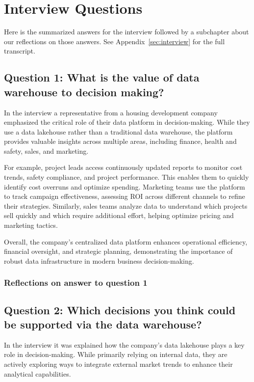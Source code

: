 \section{Interview Questions}
Here is the summarized answers for the interview followed by a subchapter about our reflections on those answers. See Appendix~\ref{sec:interview} for the full transcript.
\subsection{Question 1: What is the value of data warehouse to decision making?}

In the interview a representative from a housing development company emphasized the critical role of their data platform 
in decision-making. While they use a data lakehouse rather than a traditional data warehouse, the platform provides valuable 
insights across multiple areas, including finance, health and safety, sales, and marketing.

For example, project leads access continuously updated reports to monitor cost trends, safety compliance, and project performance. 
This enables them to quickly identify cost overruns and optimize spending. Marketing teams use the platform to track campaign 
effectiveness, assessing ROI across different channels to refine their strategies. Similarly, sales teams analyze data to understand 
which projects sell quickly and which require additional effort, helping optimize pricing and marketing tactics.

Overall, the company's centralized data platform enhances operational efficiency, financial oversight, and strategic planning, 
demonstrating the importance of robust data infrastructure in modern business decision-making.
\subsubsection{Reflections on answer to question 1}
\subsection{Question 2: Which decisions you think could be supported via the data warehouse?}

In the interview it was explained how the company's data lakehouse plays a key role in decision-making. While primarily relying on 
internal data, they are actively exploring ways to integrate external market trends to enhance their analytical capabilities.

